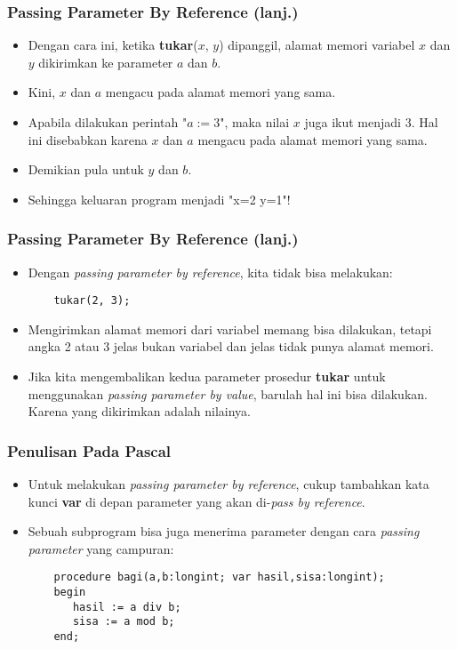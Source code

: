 \documentclass{beamer}
\begin{document}
\begin{frame}[fragile]
\frametitle{Passing Parameter By Reference (lanj.)}
\begin{itemize}
    \item Dengan cara ini, ketika \textbf{tukar}($x$, $y$) dipanggil, \alert{alamat memori variabel} $x$ dan $y$ dikirimkan ke parameter $a$ dan $b$.
    \item Kini, $x$ dan $a$ mengacu pada alamat memori yang sama.
    \item Apabila dilakukan perintah "$a := 3$", maka nilai $x$ juga ikut menjadi 3. Hal ini disebabkan karena $x$ dan $a$ mengacu pada \alert{alamat memori yang sama}.
    \item Demikian pula untuk $y$ dan $b$.
    \item Sehingga keluaran program menjadi "x=2 y=1"!
\end{itemize}
\end{frame}

\begin{frame}[fragile]
\frametitle{Passing Parameter By Reference (lanj.)}
\begin{itemize}
    \item Dengan \textit{passing parameter by reference}, kita tidak bisa melakukan:
    \begin{lstlisting}
    tukar(2, 3);
    \end{lstlisting}

    \item Mengirimkan alamat memori dari variabel memang bisa dilakukan, tetapi angka 2 atau 3 jelas bukan variabel dan jelas \alert{tidak punya alamat memori}.
    \item Jika kita mengembalikan kedua parameter prosedur \textbf{tukar} untuk menggunakan \textit{passing parameter by value}, barulah hal ini bisa dilakukan. Karena yang dikirimkan adalah \alert{nilainya}.
\end{itemize}
\end{frame}

\begin{frame}[fragile]
\frametitle{Penulisan Pada Pascal}
\begin{itemize}
    \item Untuk melakukan \textit{passing parameter by reference}, cukup tambahkan kata kunci \textbf{var} di depan parameter yang akan di-\textit{pass by reference}.
    \item Sebuah subprogram bisa juga menerima parameter dengan cara \textit{passing parameter} yang campuran:
    \begin{lstlisting}
    procedure bagi(a,b:longint; var hasil,sisa:longint);
    begin
       hasil := a div b;
       sisa := a mod b;
    end;
    \end{lstlisting}
\end{itemize}
\end{frame}
\end{document}
